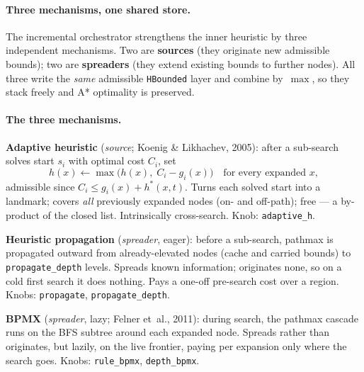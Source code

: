 \documentclass[11pt, a4paper]{article}
\begin{document}
\paragraph{Three mechanisms, one shared store.}

The incremental orchestrator strengthens the inner heuristic by
three independent mechanisms. Two are \textbf{sources} (they
originate new admissible bounds); two are \textbf{spreaders}
(they extend existing bounds to further nodes). All three write
the \emph{same} admissible \texttt{HBounded} layer and combine
by~$\max$, so they stack freely and A* optimality is preserved.

\paragraph{The three mechanisms.}

\begin{sentences}
\item \textbf{Adaptive heuristic} (\emph{source};
      Koenig \& Likhachev, 2005): after a sub-search solves
      start $s_i$ with optimal cost $C_i$, set
      \[
          h(x) \leftarrow \max\bigl(h(x),\; C_i - g_i(x)\bigr)
          \quad\text{for every expanded } x,
      \]
      admissible since $C_i \le g_i(x) + h^*(x, t)$. Turns each
      solved start into a landmark; covers \emph{all}
      previously expanded nodes (on- and off-path); free --- a
      by-product of the closed list. Intrinsically cross-search.
      Knob: \texttt{adaptive\_h}.

\item \textbf{Heuristic propagation} (\emph{spreader}, eager):
      before a sub-search, pathmax is propagated outward from
      already-elevated nodes (cache and carried bounds) to
      \texttt{propagate\_depth} levels. Spreads known
      information; originates none, so on a cold first search it
      does nothing. Pays a one-off pre-search cost over a
      region. Knobs: \texttt{propagate}, \texttt{propagate\_depth}.

\item \textbf{BPMX} (\emph{spreader}, lazy; Felner et~al.,
      2011): during search, the pathmax cascade runs on the BFS
      subtree around each expanded node. Spreads rather than
      originates, but lazily, on the live frontier, paying per
      expansion only where the search goes. Knobs:
      \texttt{rule\_bpmx}, \texttt{depth\_bpmx}.
\end{sentences}
\end{document}
